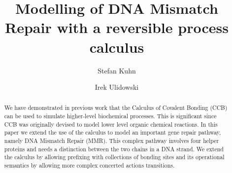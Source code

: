 \documentclass[review]{elsarticle}
\begin{document}
\begin{frontmatter}

\title{Modelling of DNA Mismatch Repair with a reversible process calculus}

\author{Stefan Kuhn}%
\address{School of Computer Science and Informatics, De Montfort University, Leicester, UK}

\author{Irek Ulidowski}%
\address{School of Computing and Mathematical Sciences, University of Leicester, Leicester, UK}


%

\begin{abstract}
%
%
We have demonstrated in previous work that the Calculus of Covalent Bonding (CCB) can be used to simulate higher-level biochemical processes. This is significant since CCB was originally devised to model lower level organic chemical reactions. In this paper we extend the use of the calculus  to model an important gene repair pathway, namely DNA Mismatch Repair (MMR). This complex pathway involves four helper proteins and needs a distinction between the two chains in a DNA strand. 
We extend the calculus by allowing prefixing with collections of bonding sites and its operational semantics by allowing more complex concerted actions transitions.
\end{abstract}


\end{frontmatter}
\end{document}

